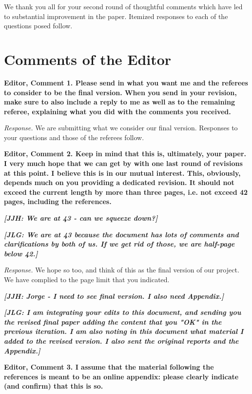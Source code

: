 \restoregeometry
\doublespacing

\noindent We thank you all for your second round of thoughtful comments which have led to substantial improvement in the paper. Itemized responses to each of the questions posed follow.

\section*{Comments of the Editor}

\noindent \textbf{Editor, Comment 1. Please send in what you want me and the referees to consider to be the final version. When you send in your revision, make sure to also include a reply to me as well as to the remaining referee, explaining what you did with the comments you received.} 

\noindent \textit{Response.} We are submitting what we consider our final version. Responses to your questions and those of the referees follow. 

\noindent \textbf{Editor, Comment 2. Keep in mind that this is, ultimately, your paper. I very much hope that we can get by with one last round of revisions at this point. I believe this is in our mutual interest. This, obviously, depends much on you providing a dedicated revision. It should not exceed the current length by more than three pages, i.e. not exceed 42 pages, including the references.}

\noindent \textbf{\textit{[JJH: We are at 43 - can we squeeze down?]}}

\noindent \textbf{\textit{[JLG: We are at 43 because the document has lots of comments and clarifications by both of us. If we get rid of those, we are half-page below 42.]}}

\noindent \textit{Response.} We hope so too, and think of this as the final version of our project. We have complied to the page limit that you indicated.

\noindent \textbf{\textit{[JJH: Jorge - I need to see final version. I also need Appendix.]}}

\noindent \textbf{\textit{[JLG: I am integrating your edits to this document, and sending you the revised final paper adding the content that you "OK" in the previous iteration. I am also noting in this document what material I added to the revised version. I also sent the original reports and the Appendix.]}}

\noindent \textbf{Editor, Comment 3. I assume that the material following the references is meant to be an online appendix: please clearly indicate (and confirm) that this is so.}

